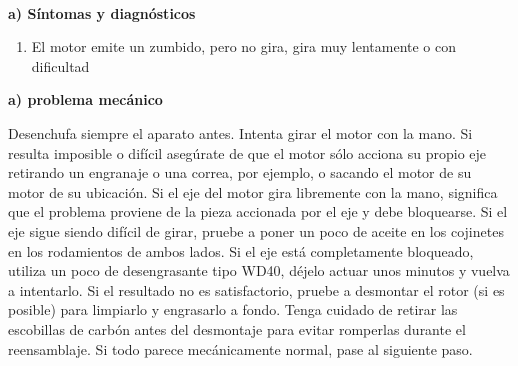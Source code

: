 \noindent{}\\

\textbf{a) Síntomas y diagnósticos}
\begin{enumerate}
\item El motor emite un zumbido, pero no gira, gira muy lentamente o con dificultad
\end{enumerate}

{\small \textbf{a) problema mecánico}\\}

Desenchufa siempre el aparato antes.
Intenta girar el motor con la mano. Si resulta imposible o difícil asegúrate de que el motor sólo acciona su propio eje retirando un engranaje o una correa, por ejemplo, o sacando el motor de su motor de su ubicación.
Si el eje del motor gira libremente con la mano, significa que el problema
proviene de la pieza accionada por el eje y debe bloquearse.
Si el eje sigue siendo difícil de girar, pruebe a poner un poco de aceite en los cojinetes en los rodamientos de ambos lados.
Si el eje está completamente bloqueado, utiliza un poco de desengrasante tipo WD40,
déjelo actuar unos minutos y vuelva a intentarlo.
Si el resultado no es satisfactorio, pruebe a desmontar el rotor (si es posible) para limpiarlo y engrasarlo a fondo.
Tenga cuidado de retirar las escobillas de carbón antes del desmontaje para evitar romperlas durante el reensamblaje. Si todo parece mecánicamente normal, pase al siguiente paso.

